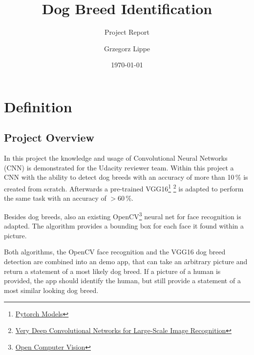 \documentclass[paper=A4, DIV=calc, parskip=half]{scrartcl}
\title{Dog Breed Identification}
\subtitle{Project Report}
\author{Grzegorz Lippe}
\date{\today}
\begin{document}
\maketitle


  
\section*{Definition}

\subsection*{Project Overview}

In this project the knowledge and usage of Convolutional Neural Networks (CNN)
is demonstrated for the Udacity reviewer team. Within this project a CNN with
the ability to detect dog breeds with an accuracy of more than 10\,\% is created
from scratch. Afterwards a pre-trained
VGG16\footnote{\href{https://pytorch.org/vision/0.8/models.html}{Pytorch Models}}
\footnote{\href{https://arxiv.org/abs/1409.1556}{Very Deep Convolutional
Networks for Large-Scale Image Recognition}} is adapted to perform the same task
with an accuracy of $>$60\,\%.

Besides dog breeds, also an existing
OpenCV\footnote{\href{https://opencv.org/}{Open Computer Vision}} neural net for
face recognition is adapted. The algorithm provides a bounding box for each face
it found within a picture.

Both algorithms, the OpenCV face recognition and the VGG16 dog breed detection
are combined into an demo app, that can take an arbitrary picture and return a
statement of a most likely dog breed. If a picture of a human is provided, the
app should identify the human, but still provide a statement of a most similar
looking dog breed.


\end{document}
